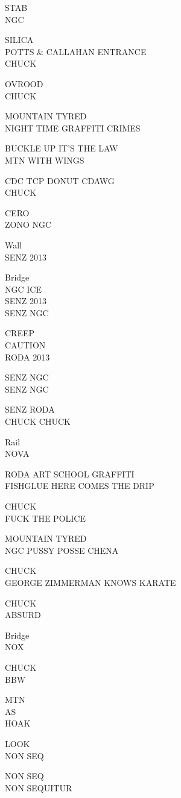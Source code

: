 \documentclass[10pt,letterpaper]{article}
\begin{document}
STAB\\
NGC

SILICA\\
POTTS \& CALLAHAN ENTRANCE\\
CHUCK

OVROOD\\
CHUCK

MOUNTAIN TYRED\\
NIGHT TIME GRAFFITI CRIMES

BUCKLE UP IT'S THE LAW\\
MTN WITH WINGS

CDC TCP DONUT CDAWG\\
CHUCK

CERO\\
ZONO NGC

Wall\\
SENZ 2013

Bridge\\
NGC ICE\\
SENZ 2013\\
SENZ NGC

CREEP\\
CAUTION\\
RODA 2013

SENZ NGC\\
SENZ NGC

SENZ RODA\\
CHUCK CHUCK

Rail\\
NOVA

RODA ART SCHOOL GRAFFITI\\
FISHGLUE HERE COMES THE DRIP

CHUCK\\
FUCK THE POLICE

MOUNTAIN TYRED\\
NGC PUSSY POSSE CHENA

CHUCK\\
GEORGE ZIMMERMAN KNOWS KARATE

CHUCK\\
ABSURD

Bridge\\
NOX

CHUCK\\
BBW

MTN\\
AS\\
HOAK

LOOK\\
NON SEQ

NON SEQ\\
NON SEQUITUR
\end{document}
